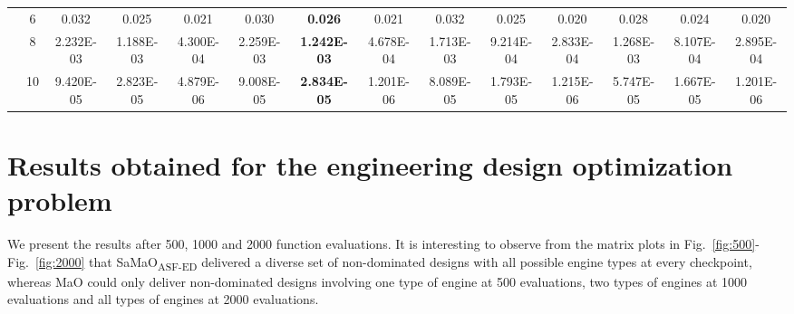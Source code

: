 \documentclass[onecolumn,10pt]{asme2ej}
\begin{document}
\begin{table}[!htb]
\begin{tabular}{|c|c|c|c|c|c|c|c|c|c|c|c|c|c|}
	& 6          & 0.032         & 0.025              & 0.021          & 0.030         & \textbf{0.026}     & 0.021          & 0.032         & 0.025              & 0.020          & 0.028         & 0.024              & 0.020          \\ \cline{2-14} 
	& 8          & 2.232E-03     & 1.188E-03          & 4.300E-04      & 2.259E-03     & \textbf{1.242E-03} & 4.678E-04      & 1.713E-03     & 9.214E-04          & 2.833E-04      & 1.268E-03     & 8.107E-04          & 2.895E-04      \\ \cline{2-14} 
	& 10         & 9.420E-05     & 2.823E-05          & 4.879E-06      & 9.008E-05     & \textbf{2.834E-05} & 1.201E-06      & 8.089E-05     & 1.793E-05          & 1.215E-06      & 5.747E-05     & 1.667E-05          & 1.201E-06      \\ \hline
\end{tabular}
\end{table}

\clearpage

\section{Results obtained for the engineering design optimization problem}

We present the results after 500, 1000 and 2000 function evaluations. It is interesting to observe from the matrix plots in Fig.~\ref{fig:500}-Fig.~\ref{fig:2000} that SaMaO\textsubscript{ASF-ED} delivered a diverse set of non-dominated designs with all possible engine types at every checkpoint, whereas MaO could only deliver non-dominated designs involving one type of engine at 500 evaluations, two types of engines at 1000 evaluations and all types of engines at 2000 evaluations. 
\end{document}
